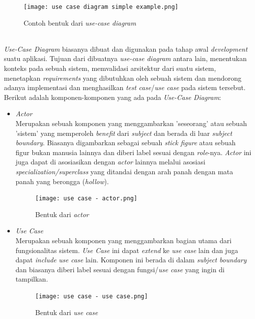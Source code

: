 \documentclass[a4paper]{article}
\begin{document}
\begin{enumerate}
    \begin{figure}[h]
        \centering
        \texttt{[image: use case diagram simple example.png]}
        \caption{Contoh bentuk dari \textit{use-case diagram}}
    \end{figure}\\
    \textit{Use-Case Diagram} biasanya dibuat dan digunakan pada tahap awal \textit{development} suatu aplikasi. Tujuan dari dibuatnya \textit{use-case diagram} antara lain, menentukan konteks pada sebuah sistem, memvalidasi arsitektur dari suatu sistem, menetapkan \textit{requirements} yang dibutuhkan oleh sebuah sistem dan mendorong adanya implementasi dan menghasilkan \textit{test case}/\textit{use case} pada sistem tersebut. Berikut adalah komponen-komponen yang ada pada \textit{Use-Case Diagram}:
    \begin{itemize}
        \item \textit{Actor}\\
        Merupakan sebuah komponen yang menggambarkan 'seseorang' atau sebuah 'sistem' yang memperoleh \textit{benefit} dari \textit{subject} dan berada di luar \textit{subject boundary}. Biasanya digambarkan sebagai sebuah \textit{stick figure} atau sebuah figur bukan manusia lainnya dan diberi label sesuai dengan \textit{role}-nya. \textit{Actor} ini juga dapat di asosiasikan dengan \textit{actor} lainnya melalui asosiasi \textit{specialization/superclass} yang ditandai dengan arah panah dengan mata panah yang berongga (\textit{hollow})\autocite{systemanalysisdesign-use-case-diagram}.
        \begin{figure}[h]
            \centering
            \texttt{[image: use case - actor.png]}
            \caption{Bentuk dari \textit{actor}}
        \end{figure}
        \newpage
        \item \textit{Use Case}\\
        Merupakan sebuah komponen yang menggambarkan bagian utama dari fungsionalitas sistem. \textit{Use Case} ini dapat \textit{extend} ke \textit{use case} lain dan juga dapat \textit{include} \textit{use case} lain. Komponen ini berada di dalam \textit{subject boundary} dan biasanya diberi label sesuai dengan fungsi/\textit{use case} yang ingin di tampilkan\autocite{systemanalysisdesign-use-case-diagram}.
        \begin{figure}[h]
            \centering
            \texttt{[image: use case - use case.png]}
            \caption{Bentuk dari \textit{use case}}
        \end{figure}

\end{itemize}
\end{enumerate}
\end{document}
